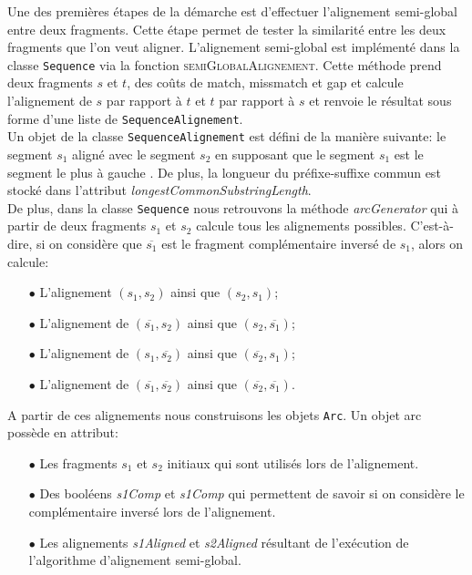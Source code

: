 Une des premières étapes de la démarche est d'effectuer l'alignement semi-global
entre deux fragments. Cette étape permet de tester la similarité entre les deux
fragments que l'on veut aligner. L'alignement semi-global est implémenté dans la
classe \verb|Sequence| via la fonction \textsc{semiGlobalAlignement}. Cette
méthode prend deux fragments $s$ et $t$, des coûts de match, missmatch et gap
et calcule l'alignement de $s$ par rapport à $t$ et $t$ par rapport à $s$ et
renvoie le résultat sous forme d'une liste de \verb|SequenceAlignement|.\\

Un objet de la classe \verb|SequenceAlignement| est défini de la manière
suivante: le segment $s_1$ aligné avec le segment $s_2$ en supposant que le
segment $s_1$ est le segment le plus à \og gauche \fg. De plus, la longueur du
préfixe-suffixe commun est stocké dans l'attribut \emph{longestCommonSubstringLength}.\\

De plus, dans la classe \verb|Sequence| nous retrouvons la méthode \emph{arcGenerator} qui à partir de deux fragments $s_1$ et $s_2$ calcule tous les alignements possibles. C'est-à-dire, si on considère que $\overline{s_1}$ est le fragment complémentaire inversé de $s_1$, alors on calcule:\\
\begin{itemize}
	\item[$\bullet$] L'alignement $(s_1,s_2)$ ainsi que $(s_2,s_1)$;
	\item[$\bullet$] L'alignement de $(\overline{s_1},s_2)$ ainsi que $(s_2, \overline{s_1})$;
	\item[$\bullet$] L'alignement de $(s_1, \overline{s_2})$ ainsi que $(\overline{s_2},s_1)$;
	\item[$\bullet$] L'alignement de $(\overline{s_1}, \overline{s_2})$ ainsi que $(\overline{s_2}, \overline{s_1})$.
\end{itemize}
$ $\\
A partir de ces alignements nous construisons les objets \verb|Arc|. Un objet arc possède en attribut:\\

\begin{itemize}
	\item[$\bullet$] Les fragments $s_1$ et $s_2$ initiaux qui sont utilisés lors de l'alignement.
	\item[$\bullet$] Des booléens \emph{s1Comp} et \emph{s1Comp} qui permettent de savoir si on considère le complémentaire inversé lors de l'alignement.
	\item[$\bullet$] Les alignements \emph{s1Aligned} et \emph{s2Aligned}  résultant de l'exécution de l'algorithme d'alignement semi-global.
\end{itemize}

